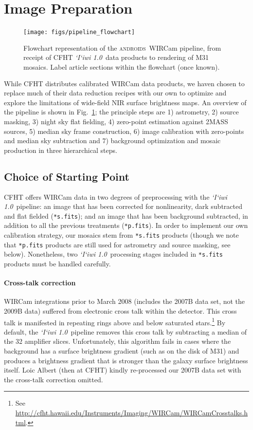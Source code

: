 \documentclass[iop]{emulateapj}
\newcommand{\sw}[1]{\textit{#1}} %
\newcommand{\iiwione}{\sw{`I`iwi 1.0}}
\newcommand{\androids}{\textsc{androids}}
\newcommand{\todo}[1]{\textcolor{BurntOrange}{\textsf{#1}}} %
\newcommand{\Fig}[1]{Fig.~\ref{fig:#1}}  %
\begin{document}
\section{Image Preparation}
\label{sec:reduction}

\begin{figure}[t]
\centering
\texttt{[image: figs/pipeline\_flowchart]}
\caption{Flowchart representation of the \androids\ WIRCam pipeline, from receipt of CFHT \iiwione\ data products to rendering of M31 mosaics.
\todo{Label article sections within the flowchart (once known).}}
\label{fig:flowchart}
\end{figure}

While CFHT distributes calibrated WIRCam data products, we haven chosen to replace much of their data reduction recipes with our own to optimize and explore the limitations of wide-field NIR surface brightness maps.
An overview of the pipeline is shown in \Fig{flowchart}; the principle steps are 1) astrometry, 2) source masking, 3) night sky flat fielding, 4) zero-point estimation against 2MASS sources, 5) median sky frame construction, 6) image calibration with zero-points and median sky subtraction and 7) background optimization and mosaic production in three hierarchical steps.

\subsection{Choice of Starting Point}

CFHT offers WIRCam data in two degrees of preprocessing with the \iiwione\ pipeline: an image that has been corrected for nonlinearity, dark subtracted and flat fielded (\texttt{*s.fits}); and an image that has been background subtracted, in addition to all the previous treatments (\texttt{*p.fits}).
In order to implement our own calibration strategy, our mosaics stem from \texttt{*s.fits} products (though we note that \texttt{*p.fits} products are still used for astrometry and source masking, see below).
Nonetheless, two \iiwione\ processing stages included in \texttt{*s.fits} products must be handled carefully.

\paragraph{Cross-talk correction} WIRCam integrations prior to March 2008 (includes the 2007B data set, not the 2009B data) suffered from electronic cross talk within the detector.
This cross talk is manifested in repeating rings above and below saturated stars.\footnote{See \url{http://cfht.hawaii.edu/Instruments/Imaging/WIRCam/WIRCamCrosstalks.html}.}
By default, the \iiwione\ pipeline removes this cross talk by subtracting a median of the 32 amplifier slices.
Unfortunately, this algorithm fails in cases where the background has a surface brightness gradient (such as on the disk of M31) and produces a brightness gradient that is stronger than the galaxy surface brightness itself.
Loic Albert (then at CFHT) kindly re-processed our 2007B data set with the cross-talk correction omitted.
\end{document}
